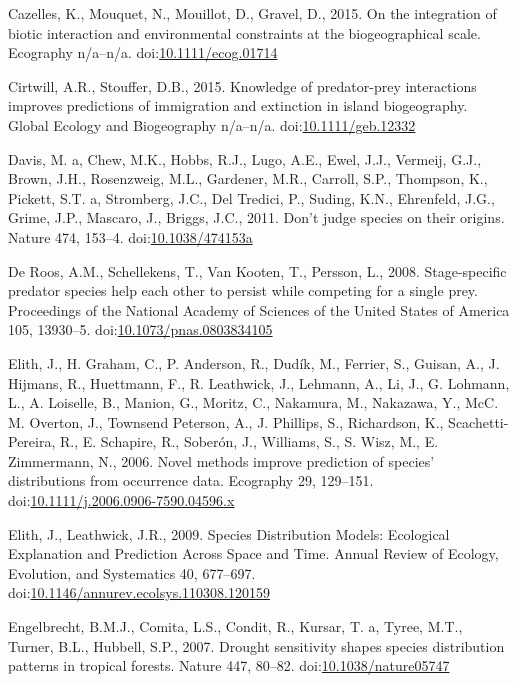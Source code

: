 \hypertarget{ref-Cazelles2015b}{}
Cazelles, K., Mouquet, N., Mouillot, D., Gravel, D., 2015. On the
integration of biotic interaction and environmental constraints at the
biogeographical scale. Ecography n/a--n/a.
doi:\href{https://doi.org/10.1111/ecog.01714}{10.1111/ecog.01714}

\hypertarget{ref-Cirtwill2015}{}
Cirtwill, A.R., Stouffer, D.B., 2015. Knowledge of predator-prey
interactions improves predictions of immigration and extinction in
island biogeography. Global Ecology and Biogeography n/a--n/a.
doi:\href{https://doi.org/10.1111/geb.12332}{10.1111/geb.12332}

\hypertarget{ref-Davis2011}{}
Davis, M. a, Chew, M.K., Hobbs, R.J., Lugo, A.E., Ewel, J.J., Vermeij,
G.J., Brown, J.H., Rosenzweig, M.L., Gardener, M.R., Carroll, S.P.,
Thompson, K., Pickett, S.T. a, Stromberg, J.C., Del Tredici, P., Suding,
K.N., Ehrenfeld, J.G., Grime, J.P., Mascaro, J., Briggs, J.C., 2011.
Don't judge species on their origins. Nature 474, 153--4.
doi:\href{https://doi.org/10.1038/474153a}{10.1038/474153a}

\hypertarget{ref-DeRoos2008}{}
De Roos, A.M., Schellekens, T., Van Kooten, T., Persson, L., 2008.
Stage-specific predator species help each other to persist while
competing for a single prey. Proceedings of the National Academy of
Sciences of the United States of America 105, 13930--5.
doi:\href{https://doi.org/10.1073/pnas.0803834105}{10.1073/pnas.0803834105}

\hypertarget{ref-Elith2006}{}
Elith, J., H. Graham, C., P. Anderson, R., Dudík, M., Ferrier, S.,
Guisan, A., J. Hijmans, R., Huettmann, F., R. Leathwick, J., Lehmann,
A., Li, J., G. Lohmann, L., A. Loiselle, B., Manion, G., Moritz, C.,
Nakamura, M., Nakazawa, Y., McC. M. Overton, J., Townsend Peterson, A.,
J. Phillips, S., Richardson, K., Scachetti-Pereira, R., E. Schapire, R.,
Soberón, J., Williams, S., S. Wisz, M., E. Zimmermann, N., 2006. Novel
methods improve prediction of species' distributions from occurrence
data. Ecography 29, 129--151.
doi:\href{https://doi.org/10.1111/j.2006.0906-7590.04596.x}{10.1111/j.2006.0906-7590.04596.x}

\hypertarget{ref-Elith2009a}{}
Elith, J., Leathwick, J.R., 2009. Species Distribution Models:
Ecological Explanation and Prediction Across Space and Time. Annual
Review of Ecology, Evolution, and Systematics 40, 677--697.
doi:\href{https://doi.org/10.1146/annurev.ecolsys.110308.120159}{10.1146/annurev.ecolsys.110308.120159}

\hypertarget{ref-Engelbrecht2007}{}
Engelbrecht, B.M.J., Comita, L.S., Condit, R., Kursar, T. a, Tyree,
M.T., Turner, B.L., Hubbell, S.P., 2007. Drought sensitivity shapes
species distribution patterns in tropical forests. Nature 447, 80--82.
doi:\href{https://doi.org/10.1038/nature05747}{10.1038/nature05747}

